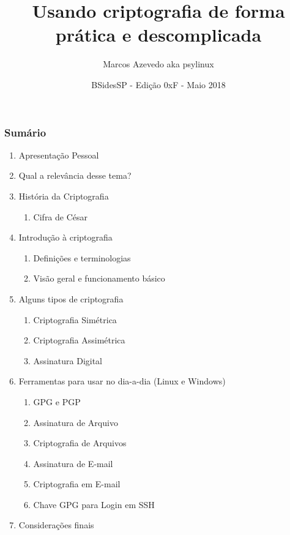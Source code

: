 \documentclass[compress]{beamer}
\title{Usando criptografia de forma prática e descomplicada}
\author{Marcos Azevedo aka psylinux}
\date{BSidesSP - Edição 0xF - Maio 2018 }
\begin{document}
\frame{\titlepage}


\begin{frame}
\frametitle{Sumário}
	\begin{enumerate}
		\item<+->{Apresentação Pessoal}
		\item<+->{Qual a relevância desse tema?}
		\item<+->{História da Criptografia}
		\begin{enumerate}
			\item<+->{Cifra de César}
		\end{enumerate}
		\item<+->{Introdução à criptografia}
		\begin{enumerate}
			\item<+->{Definições e terminologias}
			\item<+->{Visão geral e funcionamento básico}
		\end{enumerate}
		\item<+->{Alguns tipos de criptografia}
		\begin{enumerate}
			\item<+->{Criptografia Simétrica}
			\item<+->{Criptografia Assimétrica}
			\item<+->{Assinatura Digital}
		\end{enumerate}
		\item<+->{Ferramentas para usar no dia-a-dia (Linux e Windows)}
		\begin{enumerate}
			\item<+->{GPG e PGP}
			\item<+->{Assinatura de Arquivo}
			\item<+->{Criptografia de Arquivos}
			\item<+->{Assinatura de E-mail}
			\item<+->{Criptografia em E-mail}
			\item<+->{Chave GPG para Login em SSH}
		\end{enumerate}
		\item<+->{Considerações finais}
	\end{enumerate}
\end{frame}
\end{document}
